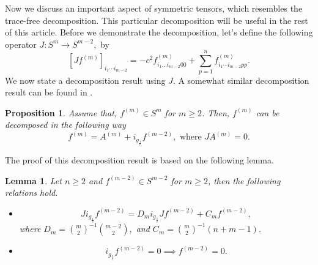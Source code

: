 \documentclass[11pt,a4paper,reqno]{amsart}
\newcommand{\gc}{i_{g_{\frac{1}{c}}}}
\newtheorem{lemma}[definition]{Lemma}
\newtheorem{proposition}[definition]
{Proposition}
\begin{document}
	Now we discuss an important aspect of symmetric tensors, which resembles the trace-free decomposition. This particular decomposition will be useful in the rest of this article. Before we demonstrate the decomposition, let's define the following operator $J:S^m\to S^{m-2}, $ by 
	\[	[Jf^{(m)}]_{i_1\cdots i_{m-2}}=-c^2f^{(m)}_{i_1\dots i_{m-2}00}+\sum_{p=1}^nf^{(m)}_{i_1\cdots i_{m-2}pp}.
	\]
	We now state a decomposition result using $J$. A somewhat similar decomposition result can be found in \cite{Dairbekov_Sharafutdinov,Paternain_Salo_Uhlmann_2023}.
	\begin{proposition}\label{decompose}
	Assume that, $f^{(m)}\in S^m$ for $m\geq 2$. Then, $f^{(m)}$ can be decomposed in the following way
	\begin{equation}\label{eq_dec}
	f^{(m)}=A^{(m)}+i_{g_{\frac{1}{c}}}f^{(m-2)}, \text{ where } JA^{(m)}=0.
	\end{equation}
	\end{proposition}
	The proof of this decomposition result is based on the following lemma. 
	\begin{lemma}\label{lem_commutator}
Let $n\ge 2$ and   $f^{(m-2)} \in S^{m-2}$ for $m\ge 2$, then the following relations hold.
\begin{itemize}
\item [1.]	\[J\gc f^{(m-2)}= D_{m}\gc Jf^{(m-2)}+ C_mf^{(m-2)},\] 
where $D_m=\binom{m}{2}^{-1}\binom{m-2}{2},$ and $C_m=\binom{m}{2}^{-1}(n+m-1)$.
\item [2.] \[\gc f^{(m-2)}=0 \implies  f^{(m-2)}=0.\]
\end{itemize}
	\end{lemma}
\end{document}
